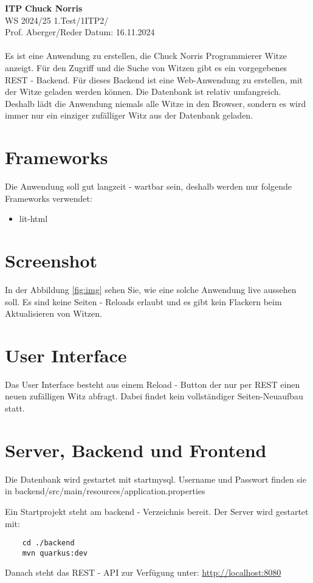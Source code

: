 \documentclass[a4paper, 11pt]{article}
\begin{document}
\noindent
\large\textbf{ITP} \hfill \textbf{Chuck Norris} \\
\normalsize WS 2024/25 \hfill 1.Test/1ITP2/\\
Prof. Aberger/Reder \hfill Datum: 16.11.2024\\
\\

\abstract{}
Es ist eine Anwendung zu erstellen, die Chuck Norris Programmierer Witze anzeigt.
Für den Zugriff und die Suche von Witzen gibt es ein vorgegebenes REST - Backend.
Für dieses Backend ist eine Web-Anwendung zu erstellen, mit der Witze geladen werden können.
Die Datenbank ist relativ umfangreich. Deshalb lädt die Anwendung niemals alle Witze in den Browser,
sondern es wird immer nur ein einziger zufälliger Witz aus der Datenbank geladen.

\section{Frameworks}

Die Anwendung soll gut langzeit - wartbar sein, deshalb werden nur folgende Frameworks verwendet:
\begin{itemize}
	\item lit-html
\end{itemize}


\section{Screenshot}

In der Abbildung \ref{fig:img} sehen Sie, wie eine solche Anwendung live aussehen soll. Es sind keine Seiten - Reloads erlaubt und
es gibt kein Flackern beim Aktualisieren von Witzen.

\section{User Interface}
Das User Interface besteht aus einem Reload - Button der nur per REST einen neuen zufälligen Witz abfragt. Dabei findet kein vollständiger Seiten-Neuaufbau statt.

\section{Server, Backend und Frontend}
Die Datenbank wird gestartet mit startmysql. Username und Passwort finden sie in backend/src/main/resources/application.properties

Ein Startprojekt steht am backend - Verzeichnis bereit. 
Der Server wird gestartet mit:
\begin{verbatim}
	cd ./backend
	mvn quarkus:dev
\end{verbatim}
Danach steht das REST - API zur Verfügung unter:
\href{http://localhost:8080}{http://localhost:8080}
\end{document}
